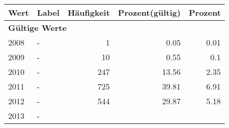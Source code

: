      \begin{longtable}{lXrrr}
     \toprule
     \textbf{Wert} & \textbf{Label} & \textbf{Häufigkeit} & \textbf{Prozent(gültig)} & \textbf{Prozent} \\
     \endhead
     \midrule
     \multicolumn{5}{l}{\textbf{Gültige Werte}}\\

     2008 &
     \multicolumn{1}{X}{ -  } &


       \num{1} &
       \num[round-mode=places,round-precision=2]{0,05} &
         \num[round-mode=places,round-precision=2]{0,01} \\

     2009 &
     \multicolumn{1}{X}{ -  } &


       \num{10} &
       \num[round-mode=places,round-precision=2]{0,55} &
         \num[round-mode=places,round-precision=2]{0,1} \\

     2010 &
     \multicolumn{1}{X}{ -  } &


       \num{247} &
       \num[round-mode=places,round-precision=2]{13,56} &
         \num[round-mode=places,round-precision=2]{2,35} \\

     2011 &
     \multicolumn{1}{X}{ -  } &


       \num{725} &
       \num[round-mode=places,round-precision=2]{39,81} &
         \num[round-mode=places,round-precision=2]{6,91} \\

     2012 &
     \multicolumn{1}{X}{ -  } &


       \num{544} &
       \num[round-mode=places,round-precision=2]{29,87} &
         \num[round-mode=places,round-precision=2]{5,18} \\

     2013 &
     \multicolumn{1}{X}{ -  } &



\end{longtable}
